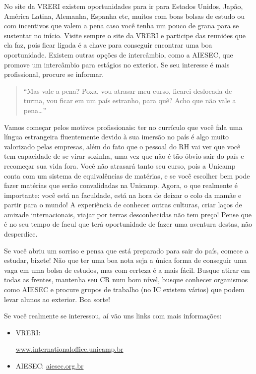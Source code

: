 No site da VRERI existem oportunidades para ir para Estados Unidos, Japão,
América Latina, Alemanha, Espanha etc, muitos com boas bolsas de estudo ou com
incentivos que valem a pena caso você tenha um pouco de grana para se sustentar
no início. Visite sempre o site da VRERI e participe das reuniões que ela faz,
pois ficar ligada é a chave para conseguir encontrar uma boa oportunidade.
Existem outras opções de intercâmbio, como a AIESEC, que promove um intercâmbio
para estágios no exterior. Se seu interesse é mais profissional, procure se
informar.

\begin{quote}
``Mas vale a pena? Poxa, vou atrasar meu curso, ficarei deslocada de turma, vou
ficar em um país estranho, para quê? Acho que não vale a pena{\dots}''
\end{quote}

Vamos começar pelos motivos profissionais: ter no currículo que você fala uma
língua estrangeira fluentemente devido à sua imersão no país é algo muito
valorizado pelas empresas, além do fato que o pessoal do RH vai ver que você
tem capacidade de se virar sozinha, uma vez que não é tão óbvio sair do país e
recomeçar sua vida fora. Você não atrasará tanto seu curso, pois a Unicamp
conta com um sistema de equivalências de matérias, e se você escolher bem pode
fazer matérias que serão convalidadas na Unicamp. Agora, o que realmente é
importante: você está na faculdade, está na hora de deixar o colo da mamãe e
partir para o mundo! A experiência de conhecer outras culturas, criar laços de
amizade internacionais, viajar por terras desconhecidas não tem preço! Pense
que é no seu tempo de facul que terá oportunidade de fazer uma aventura destas,
não desperdice.

Se você abriu um sorriso e pensa que está preparado para sair do país, comece a
estudar, bixete! Não que ter uma boa nota seja a única forma de conseguir uma
vaga em uma bolsa de estudos, mas com certeza é a mais fácil. Busque atirar em
todas as frentes, mantenha seu CR num bom nível, busque conhecer organismos
como AIESEC e procure grupos de trabalho (no IC existem vários) que podem levar
alunos ao exterior. Boa sorte!

Se você realmente se interessou, aí vão uns links com mais informações:

\begin{itemize}
\item VRERI:
  \begin{small}
  \url{www.internationaloffice.unicamp.br}
  \end{small}
\item AIESEC: \url{aiesec.org.br}
\end{itemize}

